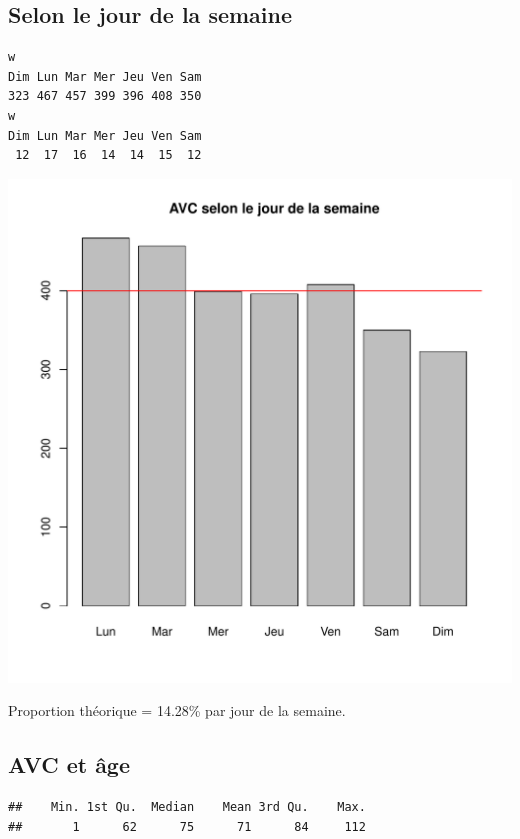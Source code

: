 \documentclass[12pt,english,french,twoside]{book}\usepackage[]{graphicx}\usepackage[]{color}
\makeatletter
\def\maxwidth{ %
  \ifdim\Gin@nat@width>\linewidth
    \linewidth
  \else
    \Gin@nat@width
  \fi
}
\newenvironment{kframe}{%
 \def\at@end@of@kframe{}%
 \ifinner\ifhmode%
  \def\at@end@of@kframe{\end{minipage}}%
  \begin{minipage}{\columnwidth}%
 \fi\fi%
 \def\FrameCommand##1{\hskip\@totalleftmargin \hskip-\fboxsep
 \colorbox{shadecolor}{##1}\hskip-\fboxsep
     \hskip-\linewidth \hskip-\@totalleftmargin \hskip\columnwidth}%
 \MakeFramed {\advance\hsize-\width
   \@totalleftmargin\z@ \linewidth\hsize
   \@setminipage}}%
 {\par\unskip\endMakeFramed%
 \at@end@of@kframe}
\newenvironment{knitrout}{}{} %
\makeatother
\begin{document}
\subsection*{Selon le jour de la semaine}

\begin{knitrout}
\color{fgcolor}\begin{kframe}
\begin{verbatim}
w
Dim Lun Mar Mer Jeu Ven Sam 
323 467 457 399 396 408 350 
w
Dim Lun Mar Mer Jeu Ven Sam 
 12  17  16  14  14  15  12 
\end{verbatim}
\end{kframe}
\includegraphics[width=\maxwidth]{figure/avc_jour_semaine} 

\end{knitrout}

Proportion théorique = 14.28\% par jour de la semaine.

\subsection*{AVC et âge}
\begin{knitrout}
\color{fgcolor}\begin{kframe}
\begin{verbatim}
##    Min. 1st Qu.  Median    Mean 3rd Qu.    Max. 
##       1      62      75      71      84     112
\end{verbatim}
\end{kframe}
\end{knitrout}
\end{document}
